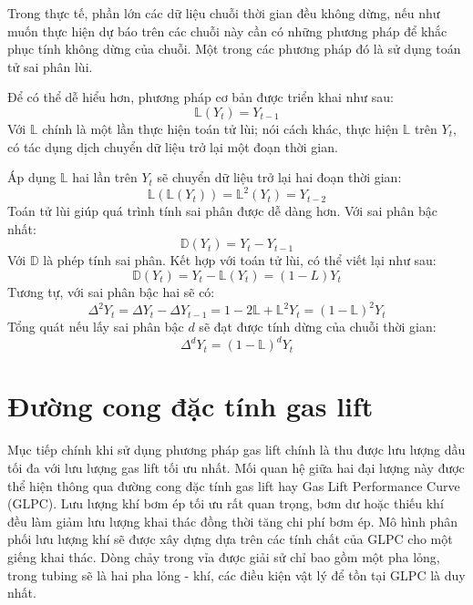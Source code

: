 \documentclass[12pt,a4paper]{report}
\begin{document}
Trong thực tế, phần lớn các dữ liệu chuỗi thời gian đều không dừng, nếu như muốn thực hiện dự báo trên các chuỗi này cần có những phương pháp để khắc phục tính không dừng của chuỗi. Một trong các phương pháp đó là sử dụng toán tử sai phân lùi.

Để có thể dễ hiểu hơn, phương pháp cơ bản được triển khai như sau:
	\begin{equation}
		\mathbb{L}(Y_t) = Y_{t-1}
	\end{equation}
Với $\mathbb{L}$ chính là một lần thực hiện toán tử lùi; nói cách khác, thực hiện $\mathbb{L}$ trên $Y_t$, có tác dụng dịch chuyển dữ liệu trở lại một đoạn thời gian.

Áp dụng $\mathbb{L}$ hai lần trên $Y_t$ sẽ chuyển dữ liệu trở lại hai đoạn thời gian:
	\begin{equation}
		\mathbb{L}(\mathbb{L}(Y_t)) = \mathbb{L}^2(Y_t) = Y_{t-2}
	\end{equation}
Toán tử lùi giúp quá trình tính sai phân được dễ dàng hơn. Với sai phân bậc nhất:
	\begin{equation}
		\mathbb{D}(Y_t) = Y_t - Y_{t-1}
	\end{equation}
Với $\mathbb{D}$ là phép tính sai phân. Kết hợp với toán tử lùi, có thể viết lại như sau:
	\begin{equation}
		\mathbb{D}(Y_t) = Y_t - \mathbb{L}(Y_t) = (1 - L)Y_t
	\end{equation}
Tương tự, với sai phân bậc hai sẽ có:
	\begin{equation}
		\Delta^2Y_t = \Delta Y_t - \Delta Y_{t-1} = 1-2\mathbb{L}+\mathbb{L}^2 Y_t = (1 - \mathbb{L})^2Y_t
	\end{equation}
Tổng quát nếu lấy sai phân bậc $d$ sẽ đạt được tính dừng của chuỗi thời gian:
	\begin{equation}
		\Delta^dY_t = (1 - \mathbb{L})^dY_t
	\end{equation}

\section{Đường cong đặc tính gas lift}
Mục tiếp chính khi sử dụng phương pháp gas lift chính là thu được lưu lượng dầu tối đa với lưu lượng gas lift tối ưu nhất. Mối quan hệ giữa hai đại lượng này được thể hiện thông qua đường cong đặc tính gas lift hay Gas Lift Performance Curve (GLPC). Lưu lượng khí bơm ép tối ưu rất quan trọng, bơm dư hoặc thiếu khí đều làm giảm lưu lượng khai thác đồng thời tăng chi phí bơm ép. Mô hình phân phối lưu lượng khí sẽ được xây dựng dựa trên các tính chất của GLPC cho một giếng khai thác. Dòng chảy trong vỉa được giải sử chỉ bao gồm một pha lỏng, trong tubing sẽ là hai pha lỏng - khí, các điều kiện vật lý để tồn tại GLPC là duy nhất.\\
\end{document}
